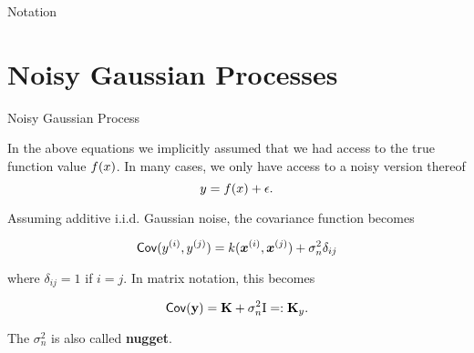\begin{vbframe}{Notation}




\end{vbframe}



\section{Noisy Gaussian Processes}

\begin{vbframe}{Noisy Gaussian Process}

In the above equations we implicitly assumed that we had access to the true function value $f(x)$. In many cases, we only have access to a noisy version thereof 
$$
y = f(x) + \epsilon.$$ 

Assuming additive i.i.d. Gaussian noise, the covariance function becomes

$$
\mathsf{Cov}(y^{(i)}, y^{(j)}) = k(\bm{x}^{(i)}, \bm{x}^{(j)}) + \sigma_n^2 \delta_{ij}
$$

where $\delta_{ij} = 1$ if $i = j$. In matrix notation, this becomes

$$
\mathsf{Cov}(\mathbf{y}) = \mathbf{K} + \sigma_n^2\mathrm{I} =: \mathbf{K}_y.  
$$

The $\sigma_n^2$ is also called \textbf{nugget}. 

\end{vbframe}

